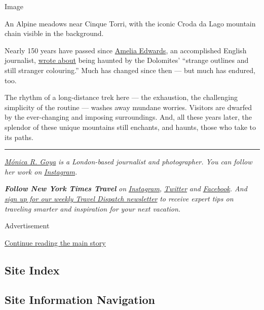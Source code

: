 Image

An Alpine meadows near Cinque Torri, with the iconic Croda da Lago
mountain chain visible in the background.

Nearly 150 years have passed since
\href{https://www.nytimes3xbfgragh.onion/2019/11/11/travel/Egypt-Nile-cruise-women.html}{Amelia
Edwards}, an accomplished English journalist,
\href{https://www.google.com/books/edition/Untrodden_Peaks_and_Unfrequented_Valleys/ECFZAAAAcAAJ?hl=en\&gbpv=1\&dq=amelia\%20edwards\%20untrodden\&pg=PA20\&printsec=frontcover}{wrote
about} being haunted by the Dolomites' ``strange outlines and still
stranger colouring.'' Much has changed since then --- but much has
endured, too.

The rhythm of a long-distance trek here --- the exhaustion, the
challenging simplicity of the routine --- washes away mundane worries.
Visitors are dwarfed by the ever-changing and imposing surroundings.
And, all these years later, the splendor of these unique mountains still
enchants, and haunts, those who take to its paths.

\begin{center}\rule{0.5\linewidth}{\linethickness}\end{center}

\href{http://www.monicargoya.com/}{\emph{Mónica R. Goya}} \emph{is a
London-based journalist and photographer. You can follow her work on}
\href{https://www.instagram.com/monicargoya/}{\emph{Instagram}}\emph{.}

\emph{\textbf{Follow New York Times Travel}} \emph{on}
\href{https://www.instagram.com/nytimestravel/}{\emph{Instagram}}\emph{,}
\href{https://twitter.com/nytimestravel}{\emph{Twitter}} \emph{and}
\href{https://www.facebookcorewwwi.onion/nytimestravel/}{\emph{Facebook}}\emph{.
And}
\href{https://www.nytimes3xbfgragh.onion/newsletters/traveldispatch}{\emph{sign
up for our weekly Travel Dispatch newsletter}} \emph{to receive expert
tips on traveling smarter and inspiration for your next vacation.}

Advertisement

\protect\hyperlink{after-bottom}{Continue reading the main story}

\hypertarget{site-index}{%
\subsection{Site Index}\label{site-index}}

\hypertarget{site-information-navigation}{%
\subsection{Site Information
Navigation}\label{site-information-navigation}}

